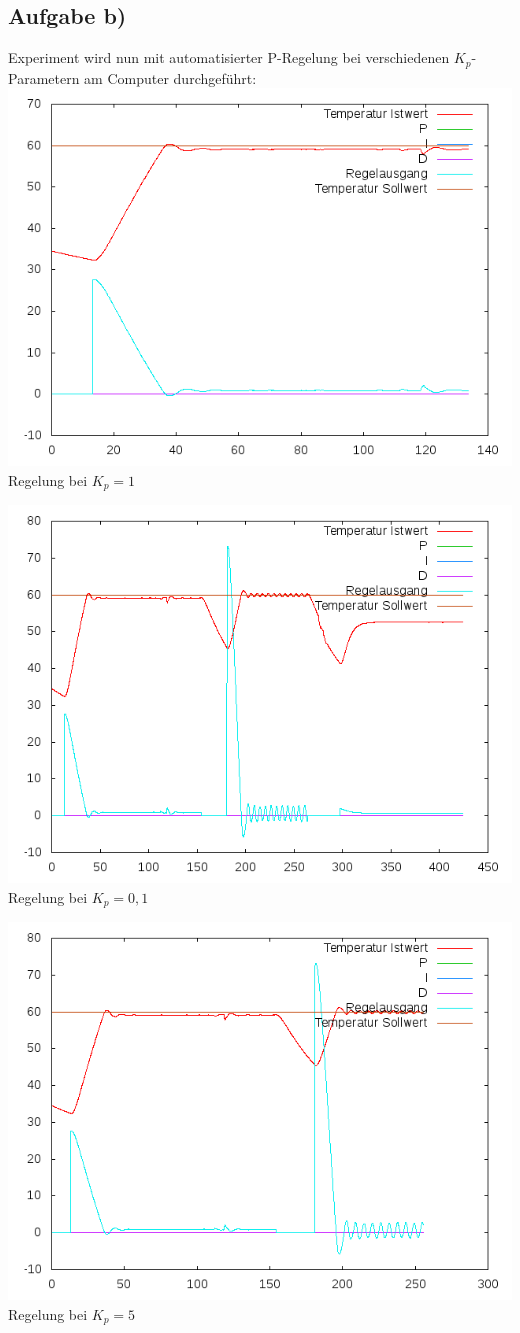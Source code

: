 \documentclass[compress,11pt]{beamer}
\begin{document}
\subsection{Aufgabe b)}
\begin{frame}
Experiment wird nun mit automatisierter P-Regelung bei verschiedenen $K_p$-Parametern am Computer durchgeführt:\\

\includegraphics[width=.7\textwidth]{../2aufgabe/2bk1}\\
Regelung bei $K_p = 1$
\end{frame}
\begin{frame}

\includegraphics[width=.7\textwidth]{../2aufgabe/2bk,1}\\
Regelung bei $K_p = 0,1$
\end{frame}
\begin{frame}

\includegraphics[width=.7\textwidth]{../2aufgabe/2bk5}\\
Regelung bei $K_p = 5$
\end{frame}
\end{document}
